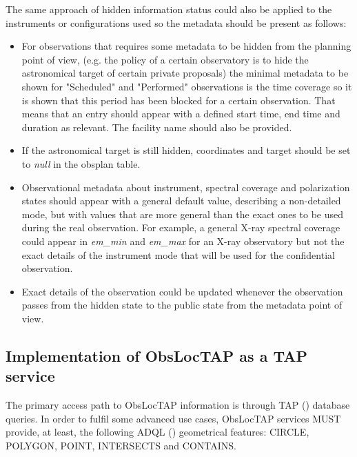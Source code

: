 \documentclass[11pt,a4paper]{ivoa}
\begin{document}
The same approach of hidden information status could also be applied to the
instruments or configurations used so the metadata should be present as follows:

\begin{itemize}
	\item{For observations that requires some metadata to be hidden from the
	 planning point of view, (e.g. the policy of a certain observatory is to
	 hide the astronomical target of certain private proposals) the minimal
	 metadata to be shown for "Scheduled" and "Performed" observations is the
	 time coverage so it is shown that this period has been blocked for a
	 certain observation.
	 That means that an entry should appear with a defined start time, end time
	 and duration as relevant. The facility name should also be provided.}
	 
	\item{If the astronomical target is still hidden, coordinates and target
  should be set to \textit{null} in the obsplan table.}

	\item{Observational metadata about instrument, spectral coverage and
  polarization states should appear with a general default value, describing a
  non-detailed mode, but with values that are more general than the exact ones
  to be used during the real observation. For example, a general X-ray spectral
  coverage could appear in \textit{em\_min} and \textit{em\_max} for an X-ray
  observatory but not the exact details of the instrument mode that will be used
  for the confidential observation.}

	\item{Exact details of the observation could be updated whenever the
  observation passes from the hidden state to the public state from the
  metadata point of view.}

\end{itemize}

\subsection{Implementation of ObsLocTAP as a TAP service}
The primary access path to ObsLocTAP information is through TAP
(\citealt{2010ivoa.spec.0327D}) database queries. In order to fulfil some advanced
use cases, ObsLocTAP services MUST provide, at least, the following ADQL
(\citealt{2008ivoa.spec.1030O}) geometrical features: CIRCLE, POLYGON, POINT, INTERSECTS and CONTAINS.\par
\end{document}
